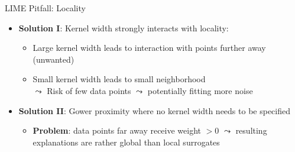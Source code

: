 \documentclass[11pt,compress,t,notes=noshow, aspectratio=169, xcolor=table]{beamer}
\begin{document}
\begin{vbframe}[c]{LIME Pitfall: Locality }
    \begin{itemize} 
         \item \textbf{Solution I}: Kernel width strongly interacts with locality:
         \begin{itemize}
             \item Large kernel width leads to interaction with points further away (unwanted)
             \item Small kernel width leads to small neighborhood\\
             $\leadsto$ Risk of few data points $\leadsto$ potentially fitting more noise
         \end{itemize}
    	\item \textbf{Solution II}: Gower proximity where no kernel width needs to be specified 
    	\begin{itemize}
    	    \item \textbf{Problem}: data points far away receive weight $ > 0$ $\leadsto$ resulting explanations are rather global than local surrogates   
    	\end{itemize}
    \end{itemize}
\vspace{0.3cm}

\end{vbframe}
\end{document}
